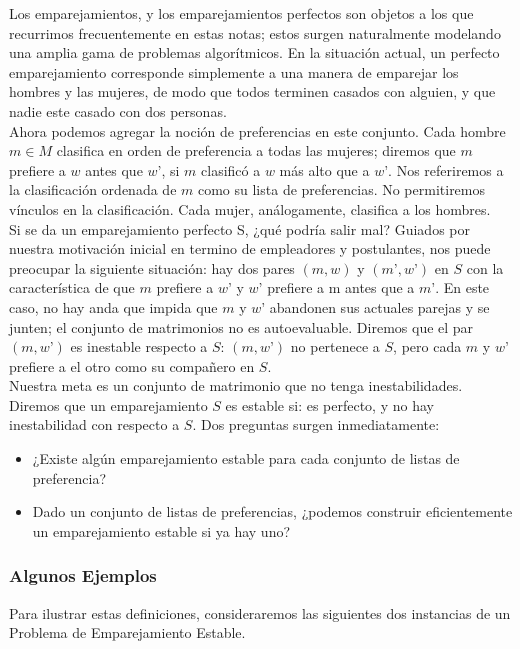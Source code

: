 \documentclass[a4paper]{article}
\begin{document}
Los emparejamientos, y los emparejamientos perfectos son objetos a los que recurrimos frecuentemente en estas notas; estos surgen naturalmente modelando una amplia gama de problemas algorítmicos. En la situación actual, un perfecto emparejamiento corresponde simplemente a una manera de emparejar los hombres y las mujeres, de modo que todos terminen casados con alguien, y que nadie este casado con dos personas.
\\
Ahora podemos agregar la noción de preferencias en este conjunto. Cada hombre $m \in M$  clasifica en orden de preferencia a todas las mujeres; diremos que $m$ prefiere a $w$ antes que $w’$, si $m$ clasificó a $w$ más alto que a $w’$. Nos referiremos a la clasificación ordenada de $m$ como su lista de preferencias. No permitiremos vínculos en la clasificación. Cada mujer, análogamente, clasifica a los hombres. \\

Si se da un emparejamiento perfecto S, ¿qué podría salir mal? Guiados por nuestra motivación inicial en termino de empleadores y postulantes, nos puede preocupar la siguiente situación:  hay dos pares $(m, w)$ y $(m’, w’)$ en $S$ con la característica de que $m$ prefiere a $w’$ y $w’$ prefiere a m antes que a $m’$. En este caso, no hay anda que impida que $m$ y $w’$ abandonen sus actuales parejas y se junten; el conjunto de matrimonios no es autoevaluable. Diremos que el par $(m,w’)$ es inestable respecto a $S$: $(m,w’)$ no pertenece a $S$, pero cada $m$ y $w’$ prefiere a el otro como su compañero en $S$. 
\\
   
Nuestra meta es un conjunto de matrimonio que no tenga inestabilidades. Diremos que un emparejamiento $S$ es estable si: es perfecto, y no hay inestabilidad con respecto a $S$. Dos preguntas surgen inmediatamente:
\\
\begin{itemize}
      \item ¿Existe algún emparejamiento estable para cada conjunto de listas de preferencia?
  \item Dado un conjunto de listas de preferencias, ¿podemos construir eficientemente un emparejamiento estable si ya hay uno? 
    \end{itemize}

\subsubsection*{Algunos Ejemplos} Para ilustrar estas definiciones, consideraremos las siguientes dos instancias de un Problema de Emparejamiento Estable.\\
\end{document}

